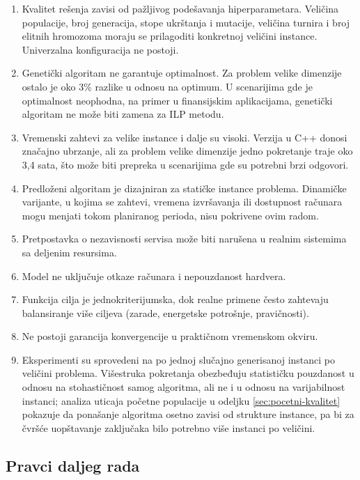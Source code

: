 \documentclass[12pt]{article}
\begin{document}
\begin{enumerate}
    \item Kvalitet rešenja zavisi od pažljivog podešavanja hiperparametara. Veličina populacije, broj generacija, stope ukrštanja i mutacije, veličina turnira i broj elitnih hromozoma moraju se prilagoditi konkretnoj veličini instance. Univerzalna konfiguracija ne postoji.
    \item Genetički algoritam ne garantuje optimalnost. Za problem velike dimenzije ostalo je oko 3\% razlike u odnosu na optimum. U scenarijima gde je optimalnost neophodna, na primer u finansijskim aplikacijama, genetički algoritam ne može biti zamena za ILP metodu.
    \item Vremenski zahtevi za velike instance i dalje su visoki. Verzija u C++ donosi značajno ubrzanje, ali za problem velike dimenzije jedno pokretanje traje oko 3,4 sata, što može biti prepreka u scenarijima gde su potrebni brzi odgovori.
    \item Predloženi algoritam je dizajniran za statičke instance problema. Dinamičke varijante, u kojima se zahtevi, vremena izvršavanja ili dostupnost računara mogu menjati tokom planiranog perioda, nisu pokrivene ovim radom.
    \item Pretpostavka o nezavisnosti servisa može biti narušena u realnim sistemima sa deljenim resursima.
    \item Model ne uključuje otkaze računara i nepouzdanost hardvera.
    \item Funkcija cilja je jednokriterijumska, dok realne primene često zahtevaju balansiranje više ciljeva (zarade, energetske potrošnje, pravičnosti).
    \item Ne postoji garancija konvergencije u praktičnom vremenskom okviru.
    \item Eksperimenti su sprovedeni na po jednoj slučajno generisanoj instanci po veličini problema. Višestruka pokretanja obezbeđuju statističku pouzdanost u odnosu na stohastičnost samog algoritma, ali ne i u odnosu na varijabilnost instanci; analiza uticaja početne populacije u odeljku \ref{sec:pocetni-kvalitet} pokazuje da ponašanje algoritma osetno zavisi od strukture instance, pa bi za čvršće uopštavanje zaključaka bilo potrebno više instanci po veličini.
\end{enumerate}

\subsection{Pravci daljeg rada}
\end{document}
